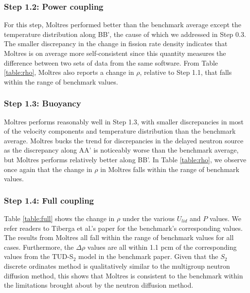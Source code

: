 \subsubsection{Step 1.2: Power coupling}

For this step, Moltres performed better than the benchmark average except
the temperature distribution along BB', the cause of which we
addressed in Step 0.3. The smaller discrepancy in the change in fission rate
density indicates that Moltres is on average more self-consistent since this
quantity measures the difference between two sets of data from the same
software. From Table \ref{table:rho}, Moltres also reports a change in $\rho$,
relative to Step 1.1, that falls within the range of benchmark values.

\subsubsection{Step 1.3: Buoyancy}

Moltres performs reasonably well in Step 1.3, with smaller
discrepancies in most of the velocity components and temperature distribution
than the benchmark average. Moltres bucks the trend for discrepancies
in the delayed neutron source as the discrepancy along AA' is
noticeably worse than the benchmark average, but Moltres performs relatively
better along BB'. In Table \ref{table:rho}, we observe once again that the
change in $\rho$ in Moltres falls within the range of benchmark values.

\subsubsection{Step 1.4: Full coupling}

Table \ref{table:full} shows the change in $\rho$ under the various $U_{lid}$
and $P$ values. We refer readers to Tiberga et al.'s paper
\citep{tiberga_results_2020} for the benchmark's corresponding values.
The results from Moltres all fall within the range of benchmark values for all
cases. Furthermore, the $\Delta\rho$ values are all within 1.1 pcm of the
corresponding values from the TUD-S$_2$ model in the benchmark paper. Given
that the $S_2$ discrete ordinates method is qualitatively similar to the
multigroup neutron diffusion method, this shows that Moltres is
consistent to the benchmark within the limitations brought about by the neutron
diffusion method.

